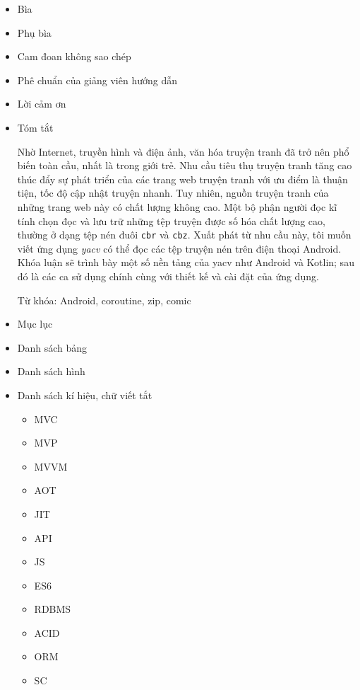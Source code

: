 \begin{itemize}
  \item
        Bìa
  \item
        Phụ bìa
  \item
        Cam đoan không sao chép
  \item
        Phê chuẩn của giảng viên hướng dẫn
  \item
        Lời cảm ơn
  \item
        Tóm tắt

        Nhờ Internet, truyền hình và điện ảnh, văn hóa truyện tranh đã trở nên
        phổ biến toàn cầu, nhất là trong giới trẻ. Nhu cầu tiêu thụ truyện
        tranh tăng cao thúc đẩy sự phát triển của các trang web truyện tranh
        với ưu điểm là thuận tiện, tốc độ cập nhật truyện nhanh. Tuy nhiên,
        nguồn truyện tranh của những trang web này có chất lượng không cao.
        Một bộ phận người đọc kĩ tính chọn đọc và lưu trữ những tệp truyện
        được số hóa chất lượng cao, thường ở dạng tệp nén đuôi \texttt{cbr} và
        \texttt{cbz}. Xuất phát từ nhu cầu này, tôi muốn viết ứng dụng
        \emph{yacv} có thể đọc các tệp truyện nén trên điện thoại Android.
        Khóa luận sẽ trình bày một số nền tảng của yacv như Android và Kotlin;
        sau đó là các ca sử dụng chính cùng với thiết kế và cài đặt của ứng
        dụng.

        Từ khóa: Android, coroutine, zip, comic
  \item
        Mục lục
  \item
        Danh sách bảng
  \item
        Danh sách hình
  \item
        Danh sách kí hiệu, chữ viết tắt

        \begin{itemize}
          
          \item
                MVC
          \item
                MVP
          \item
                MVVM
          \item
                AOT
          \item
                JIT
          \item
                API
          \item
                JS
          \item
                ES6
          \item
                RDBMS
          \item
                ACID
          \item
                ORM
          \item
                SC
        \end{itemize}
\end{itemize}

